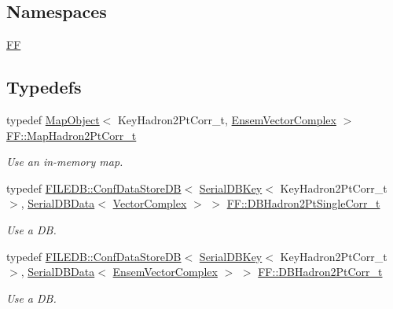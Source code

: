 \subsection*{Namespaces}
\begin{DoxyCompactItemize}
\item 
 \mbox{\hyperlink{namespaceFF}{FF}}
\end{DoxyCompactItemize}
\subsection*{Typedefs}
\begin{DoxyCompactItemize}
\item 
typedef \mbox{\hyperlink{classADAT_1_1MapObject}{Map\+Object}}$<$ Key\+Hadron2\+Pt\+Corr\+\_\+t, \mbox{\hyperlink{group__defs_ga13b984332760feb8bc9c8f1071ade9ef}{Ensem\+Vector\+Complex}} $>$ \mbox{\hyperlink{namespaceFF_a11c2f2c7c42aaa20cce9292541df810a}{F\+F\+::\+Map\+Hadron2\+Pt\+Corr\+\_\+t}}
\begin{DoxyCompactList}\small\item\em Use an in-\/memory map. \end{DoxyCompactList}\item 
typedef \mbox{\hyperlink{classFILEDB_1_1ConfDataStoreDB}{F\+I\+L\+E\+D\+B\+::\+Conf\+Data\+Store\+DB}}$<$ \mbox{\hyperlink{classADATIO_1_1SerialDBKey}{Serial\+D\+B\+Key}}$<$ Key\+Hadron2\+Pt\+Corr\+\_\+t $>$, \mbox{\hyperlink{classADATIO_1_1SerialDBData}{Serial\+D\+B\+Data}}$<$ \mbox{\hyperlink{group__defs_gab151d837d71acacce0e1c38e91e04fa3}{Vector\+Complex}} $>$ $>$ \mbox{\hyperlink{namespaceFF_af452a146ecdd7f49ca3ca53a13987359}{F\+F\+::\+D\+B\+Hadron2\+Pt\+Single\+Corr\+\_\+t}}
\begin{DoxyCompactList}\small\item\em Use a DB. \end{DoxyCompactList}\item 
typedef \mbox{\hyperlink{classFILEDB_1_1ConfDataStoreDB}{F\+I\+L\+E\+D\+B\+::\+Conf\+Data\+Store\+DB}}$<$ \mbox{\hyperlink{classADATIO_1_1SerialDBKey}{Serial\+D\+B\+Key}}$<$ Key\+Hadron2\+Pt\+Corr\+\_\+t $>$, \mbox{\hyperlink{classADATIO_1_1SerialDBData}{Serial\+D\+B\+Data}}$<$ \mbox{\hyperlink{group__defs_ga13b984332760feb8bc9c8f1071ade9ef}{Ensem\+Vector\+Complex}} $>$ $>$ \mbox{\hyperlink{namespaceFF_a01cd8ed6e36964833ba6609588a44ad0}{F\+F\+::\+D\+B\+Hadron2\+Pt\+Corr\+\_\+t}}
\begin{DoxyCompactList}\small\item\em Use a DB. \end{DoxyCompactList}\end{DoxyCompactItemize}
